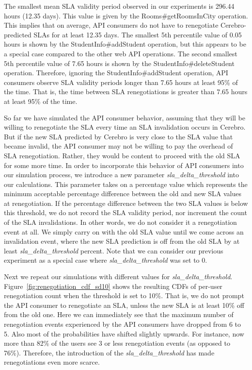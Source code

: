 The smallest
mean SLA validity period observed in our experiments is 296.44 hours (12.35 days). This value is given by the
Rooms\#getRoomsInCity operation. 
This implies that on average, API consumers do not have to renegotiate Cerebro-predicted SLAs
for at least 12.35 days.
The smallest 5th percentile value of 0.05 hours is shown by
the StudentInfo\#addStudent operation, but this appears to be a special case compared to the other web API
operations. The second smallest 5th percentile value of 7.65 hours is shown by the 
StudentInfo\#deleteStudent operation. Therefore, ignoring the StudentInfo\#addStudent operation, API
consumers observe SLA validity periods longer than 7.65 hours at least 95\% of the time. That is, the time
between SLA renegotiations is greater than 7.65 hours at least 95\% of the time.

So far we have simulated the API consumer behavior, assuming that they will be willing to renegotiate the
SLA every time an SLA invalidation occurs in Cerebro. But if the new SLA predicted by Cerebro is very
close to the SLA value that became invalid, the API consumer may not be willing to pay the overhead of
SLA renegotiation. Rather, they would be content to proceed with the old SLA for some more time. In order
to incorporate this behavior of API consumers into our simulation process, we introduce a new parameter 
\textit{sla\_delta\_threshold} into our calculations. This parameter takes on a percentage value which
represents the minimum acceptable percentage difference between the old and new SLA values at renegotiation.
If the percentage difference between the two SLA values is below this threshold, we do not record the
SLA validity period, nor increment the count of the SLA invalidations. In other words, we do not consider
it a renegotiation event at all. We simply carry on with the
old SLA value until we come across an invalidation event, where the new SLA prediction is off from the
old SLA by at least \textit{sla\_delta\_threshold} percent. Note that we can consider our previous experiment
as a special case where \textit{sla\_delta\_threshold} was set to 0.

Next we repeat our simulations with different values for \textit{sla\_delta\_threshold}. Figure~\ref{fig:renegotiation_cdf_sd10}
shows the resulting CDFs of per-user renegotiation count when the threshold is set to 10\%. That is, we 
do not prompt the API consumer to renegotiate an SLA, unless the new SLA is at least 10\% off from the old one.
Here we can immediately see that the maximum number of renegotiation events experienced by the API
consumers have dropped from 6 to 5. Also most of the probabilities have shifted slightly upwards. For instance,
now more than 82\% of the users see 3 or less renegotiation events (as opposed to 76\%). Therefore, the 
introduction of the \textit{sla\_delta\_threshold} has made renegotiations even more scarce.

